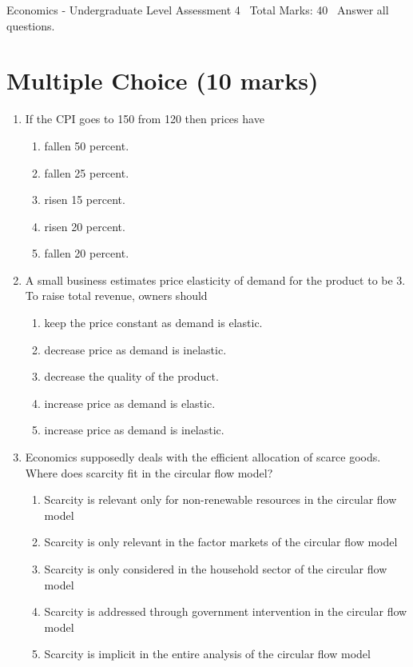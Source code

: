 \documentclass[12pt]{article}
\begin{document}
\begin{center}
Economics - Undergraduate Level Assessment 4 \
Total Marks: 40 \
Answer all questions.
\end{center}

\section*{Multiple Choice (10 marks)}
\begin{enumerate}[label=\arabic*.]
\item If the CPI goes to 150 from 120 then prices have
\begin{enumerate}[label=(\alph*)]
    \item fallen 50 percent.
    \item fallen 25 percent.
    \item risen 15 percent.
    \item risen 20 percent.
    \item fallen 20 percent.
\end{enumerate}
\item A small business estimates price elasticity of demand for the product to be 3. To raise total revenue, owners should
\begin{enumerate}[label=(\alph*)]
    \item keep the price constant as demand is elastic.
    \item decrease price as demand is inelastic.
    \item decrease the quality of the product.
    \item increase price as demand is elastic.
    \item increase price as demand is inelastic.
\end{enumerate}
\item Economics supposedly deals with the efficient allocation of scarce goods. Where does scarcity fit in the circular flow model?
\begin{enumerate}[label=(\alph*)]
    \item Scarcity is relevant only for non-renewable resources in the circular flow model
    \item Scarcity is only relevant in the factor markets of the circular flow model
    \item Scarcity is only considered in the household sector of the circular flow model
    \item Scarcity is addressed through government intervention in the circular flow model
    \item Scarcity is implicit in the entire analysis of the circular flow model

\end{enumerate}
\end{enumerate}
\end{document}
